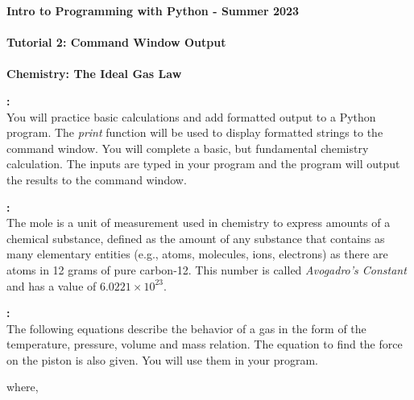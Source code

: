 \documentclass[11pt]{article}
\newcommand{\NUM}{2}
\begin{document}
	\textbf{\LARGE Intro to Programming with Python -  Summer 2023} \\\\
	\textbf{\LARGE Tutorial \NUM: Command Window Output} \\\\
	\textbf{\LARGE Chemistry: The Ideal Gas Law} \\
	
	
	\begin{description}
        \vspace{3mm}
		\item [\textbf{ \Large Overview}] \textbf{ \Large :}\\
			You will practice basic calculations and add formatted output to a Python program. The {\it print} function will be used to display formatted strings to the command window. You will complete a basic, but fundamental chemistry calculation. The inputs are typed in your program and the program will output the results to the command window. \\
 
        \item [\textbf{ \Large What is a Mole?}] \textbf{ \Large :}\\   
            The mole is a unit of measurement used in chemistry to express amounts of a chemical substance, defined as the amount of any substance that contains as many elementary entities (e.g., atoms, molecules, ions, electrons) as there are atoms in 12 grams of pure carbon-12. This number is called {\it Avogadro's Constant} and has a value of $6.0221\times10^{23}$. \\
            
        \item [\textbf{ \Large The Ideal Gas Law}] \textbf{ \Large :}\\  
            The following equations describe the behavior of a gas in the form of the temperature, pressure, volume and mass relation. The equation to find the force on the piston is also given. You will use them in your program. \\

                \hspace{15mm}     \hspace{15mm}  
                                 
            
            where,\\
            

\end{description}
\end{document}
